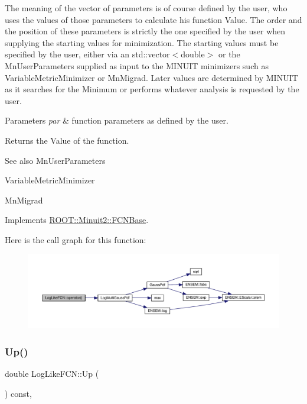 The meaning of the vector of parameters is of course defined by the user, who uses the values of those parameters to calculate his function Value. The order and the position of these parameters is strictly the one specified by the user when supplying the starting values for minimization. The starting values must be specified by the user, either via an std\+::vector$<$double$>$ or the Mn\+User\+Parameters supplied as input to the M\+I\+N\+U\+IT minimizers such as Variable\+Metric\+Minimizer or Mn\+Migrad. Later values are determined by M\+I\+N\+U\+IT as it searches for the Minimum or performs whatever analysis is requested by the user.


\begin{DoxyParams}{Parameters}
{\em par} & function parameters as defined by the user.\\
\hline
\end{DoxyParams}
\begin{DoxyReturn}{Returns}
the Value of the function.
\end{DoxyReturn}
\begin{DoxySeeAlso}{See also}
Mn\+User\+Parameters 

Variable\+Metric\+Minimizer 

Mn\+Migrad 
\end{DoxySeeAlso}


Implements \mbox{\hyperlink{classROOT_1_1Minuit2_1_1FCNBase_ae4a86bd94d0d0f5ca6fc8f8ab2bb43cd}{R\+O\+O\+T\+::\+Minuit2\+::\+F\+C\+N\+Base}}.

Here is the call graph for this function\+:\nopagebreak
\begin{figure}[H]
\begin{center}
\leavevmode
\includegraphics[width=350pt]{d2/d8c/structLogLikeFCN_a22d42d405147ecea23ab7b3a61003179_cgraph}
\end{center}
\end{figure}
\mbox{\label{structLogLikeFCN_ace81f647c3b49597fdfa5a9ff88e56d4}} 
\subsubsection{\texorpdfstring{Up()}{Up()}}
{\footnotesize\ttfamily double Log\+Like\+F\+C\+N\+::\+Up (\begin{DoxyParamCaption}{ }\end{DoxyParamCaption}) const\hspace{0.3cm}{\ttfamily [inline]}, {\ttfamily [virtual]}}

